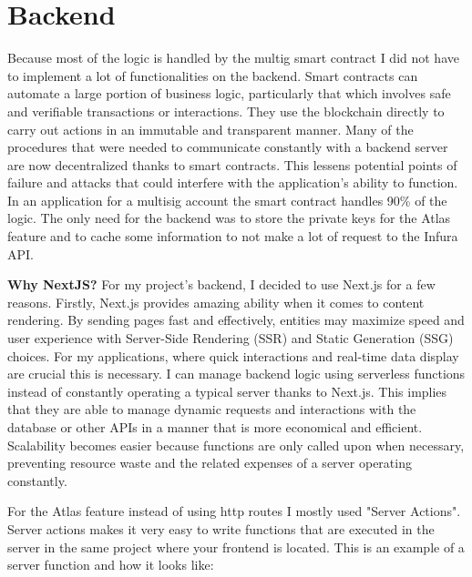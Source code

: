 \section{Backend}
\label{ch4sec3}
Because most of the logic is handled by the multig smart contract I did not have to implement a lot of functionalities on the backend. Smart contracts can automate a large portion of business logic, particularly that which involves safe and verifiable transactions or interactions. They use the blockchain directly to carry out actions in an immutable and transparent manner. Many of the procedures that were needed to communicate constantly with a backend server are now decentralized thanks to smart contracts. This lessens potential points of failure and attacks that could interfere with the application's ability to function. In an application for a multisig account the smart contract handles 90\% of the logic. The only need for the backend was to store the private keys for the Atlas feature and to cache some information to not make a lot of request to the Infura API.
\par\textbf{Why NextJS?}
For my project's backend, I decided to use Next.js for a few reasons. Firstly, Next.js provides amazing ability when it comes to content rendering. By sending pages fast and effectively, entities may maximize speed and user experience with Server-Side Rendering (SSR) and Static Generation (SSG) choices. For my applications, where quick interactions and real-time data display are crucial this is necessary. I can manage backend logic using serverless functions instead of constantly operating a typical server thanks to Next.js. This implies that they are able to manage dynamic requests and interactions with the database or other APIs in a manner that is more economical and efficient. Scalability becomes easier because functions are only called upon when necessary, preventing resource waste and the related expenses of a server operating constantly.
\par For the Atlas feature instead of using http routes I mostly used "Server Actions". Server actions makes it very easy to write functions that are executed in the server in the same project where your frontend is located. This is an example of a server function and how it looks like:

